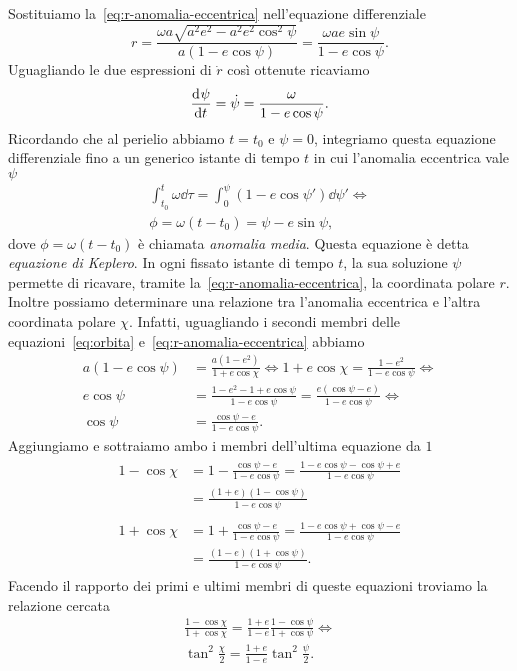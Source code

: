 Sostituiamo la~\eqref{eq:r-anomalia-eccentrica} nell'equazione differenziale
\begin{equation}
  r = \frac{\omega a\sqrt{a^2e^2 - a^2e^2\cos^2\psi}}{a(1-e\cos\psi)} =
  \frac{\omega ae\sin\psi}{1-e\cos\psi}.
\end{equation}
Uguagliando le due espressioni di $\dot{r}$ così ottenute ricaviamo
\begin{equation}
  \frac{{\mathop{}\!\mathrm{d}^{}}\psi}{\mathop{}\!\mathrm{d} {t}^{}} = \dot{\psi} = \frac{\omega}{1-e\cos\psi}.
\end{equation}
Ricordando che al perielio abbiamo $t = t_0$ e $\psi = 0$, integriamo questa
equazione differenziale fino a un generico istante di tempo $t$ in cui
l'anomalia eccentrica vale $\psi$
\begin{gather}
  \int_{t_0}^t \omega\dd \tau = \int_0^\psi(1-e\cos\psi')\dd \psi' \iff\\
  \phi = \omega(t - t_0) = \psi - e\sin\psi, \label{eq:keplero}
\end{gather}
dove $\phi = \omega(t-t_0)$ è chiamata \emph{anomalia media}. Questa equazione è
detta \emph{equazione di Keplero}. In ogni fissato istante di tempo $t$, la sua
soluzione $\psi$ permette di ricavare, tramite
la~\eqref{eq:r-anomalia-eccentrica}, la coordinata polare $r$. Inoltre possiamo
determinare una relazione tra l'anomalia eccentrica e l'altra coordinata polare
$\chi$. Infatti, uguagliando i secondi membri delle equazioni~\eqref{eq:orbita}
e~\eqref{eq:r-anomalia-eccentrica} abbiamo
\begin{equation}
  \begin{aligned}
    a(1-e\cos\psi) &= \frac{a(1-e^2)}{1+e\cos\chi} \iff 1+e\cos\chi =
    \frac{1-e^2}{1-e\cos\psi} \iff \\
    e\cos\psi &= \frac{1-e^2-1+e\cos\psi}{1-e\cos\psi} =
    \frac{e(\cos\psi-e)}{1-e\cos\psi} \iff \\
    \cos\psi &= \frac{\cos\psi-e}{1-e\cos\psi}.
  \end{aligned}
\end{equation}
Aggiungiamo e sottraiamo ambo i membri dell'ultima equazione da $1$
\begin{align}
  \begin{split}
    1-\cos\chi &= 1-\frac{\cos\psi-e}{1-e\cos\psi} =
    \frac{1-e\cos\psi-\cos\psi+e}{1-e\cos\psi} \\
    &= \frac{(1+e)(1-\cos\psi)}{1-e\cos\psi}
  \end{split} \\
  \begin{split}
    1+\cos\chi &= 1+\frac{\cos\psi-e}{1-e\cos\psi} =
    \frac{1-e\cos\psi+\cos\psi-e}{1-e\cos\psi} \\
    &= \frac{(1-e)(1+\cos\psi)}{1-e\cos\psi}.
  \end{split}
\end{align}
Facendo il rapporto dei primi e ultimi membri di queste equazioni troviamo
la relazione cercata
\begin{gather}
  \frac{1-\cos\chi}{1+\cos\chi} = \frac{1+e}{1-e}\frac{1-\cos\psi}{1+\cos\psi}
  \iff \\
  \tan^2\frac{\chi}{2} = \frac{1+e}{1-e}\tan^2\frac{\psi}{2}.
\end{gather}

